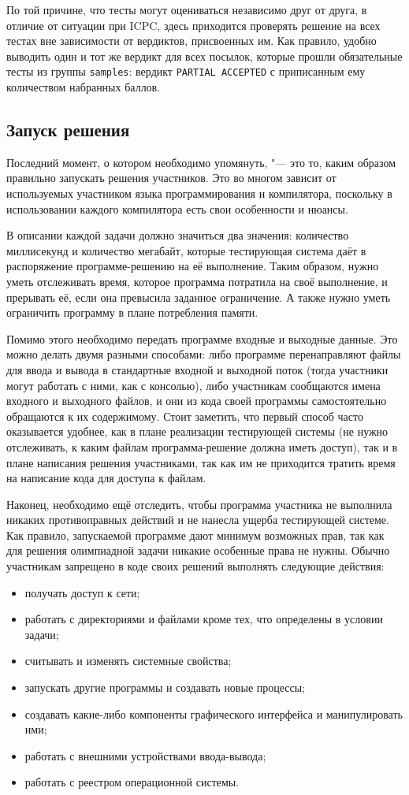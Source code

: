 По той причине, что тесты могут оцениваться независимо друг от друга, в отличие от ситуации при ICPC, здесь приходится проверять решение на всех тестах вне зависимости от вердиктов, присвоенных им. Как правило, удобно выводить один и тот же вердикт для всех посылок, которые прошли обязательные тесты из группы \texttt{samples}: вердикт \texttt{PARTIAL ACCEPTED} с приписанным ему количеством набранных баллов.

\subsection{Запуск решения}

Последний момент, о котором необходимо упомянуть, "--- это то, каким образом правильно запускать решения участников. Это во многом зависит от используемых участником языка программирования и компилятора, поскольку в использовании каждого компилятора есть свои особенности и нюансы.

В описании каждой задачи должно значиться два значения: количество миллисекунд и количество мегабайт, которые тестирующая система даёт в распоряжение программе-решению на её выполнение. Таким образом, нужно уметь отслеживать время, которое программа потратила на своё выполнение, и прерывать её, если она превысила заданное ограничение. А также нужно уметь ограничить программу в плане потребления памяти.

Помимо этого необходимо передать программе входные и выходные данные. Это можно делать двумя разными способами: либо программе перенаправляют файлы для ввода и вывода в стандартные входной и выходной поток (тогда участники могут работать с ними, как с консолью), либо участникам сообщаются имена входного и выходного файлов, и они из кода своей программы самостоятельно обращаются к их содержимому. Стоит заметить, что первый способ часто оказывается удобнее, как в плане реализации тестирующей системы (не нужно отслеживать, к каким файлам программа-решение должна иметь доступ), так и в плане написания решения участниками, так как им не приходится тратить время на написание кода для доступа к файлам.

Наконец, необходимо ещё отследить, чтобы программа участника не выполнила никаких противоправных действий и не нанесла ущерба тестирующей системе. Как правило, запускаемой программе дают минимум возможных прав, так как для решения олимпиадной задачи никакие особенные права не нужны. Обычно участникам запрещено в коде своих решений выполнять следующие действия:

\begin{itemize}
\item получать доступ к сети;
\item работать с директориями и файлами кроме тех, что определены в условии задачи;
\item считывать и изменять системные свойства;
\item запускать другие программы и создавать новые процессы;
\item создавать какие-либо компоненты графического интерфейса и манипулировать ими;
\item работать с внешними устройствами ввода-вывода;
\item работать с реестром операционной системы.
\end{itemize}